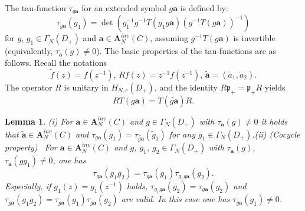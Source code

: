 \documentclass[a4paper]{article}%
\newtheorem{lemma}{Lemma}
\begin{document}
The tau-function $\tau_{g\boldsymbol{a}}$ for an extended symbol
$g\boldsymbol{a}$ is defined by:%
\[
\tau_{g\boldsymbol{a}}\left(  g_{1}\right)  =\det\left(  g_{1}^{-1}%
g^{-1}T\left(  g_{1}g\boldsymbol{a}\right)  \left(  g^{-1}T\left(
g\boldsymbol{a}\right)  \right)  ^{-1}\right)
\]
for $g$, $g_{1}\in\Gamma_{N}\left(  D_{+}\right)  $ and $\boldsymbol{a}%
\in\boldsymbol{A}_{N}^{inv}\left(  C\right)  $, assuming $g^{-1}T\left(
g\boldsymbol{a}\right)  $ is invertible (equivalently, $\tau_{\boldsymbol{a}%
}\left(  g\right)  \neq0$). The basic properties of the tau-functions are as
follows. Recall the notations%
\[
\widetilde{f}\left(  z\right)  =f\left(  z^{-1}\right)  \text{, \ \ }%
Rf(z)=z^{-1}f\left(  z^{-1}\right)  \text{, \ \ }\widetilde{\boldsymbol{a}%
}=\left(  \widetilde{a}_{1},\widetilde{a}_{2}\right)  \text{.}%
\]
The operator $R$ is unitary in $H_{N,c}\left(  D_{+}\right)  $, and the
identity $R\mathfrak{p}_{+}=\mathfrak{p}_{+}R$ yields%
\begin{equation}
RT\left(  g\boldsymbol{a}\right)  =T\left(  \widetilde{g\boldsymbol{a}%
}\right)  R\text{.} \label{2-14}%
\end{equation}


\begin{lemma}
\label{l2-5}(i) For $\boldsymbol{a}\in\boldsymbol{A}_{N}^{inv}\left(
C\right)  $ and $g\in\Gamma_{N}\left(  D_{+}\right)  $ with $\tau
_{\boldsymbol{a}}\left(  g\right)  \neq0$ it holds that $\widetilde
{\boldsymbol{a}}\in\boldsymbol{A}_{N}^{inv}\left(  C\right)  $ and
$\tau_{g\boldsymbol{a}}\left(  g_{1}\right)  =\tau_{\widetilde{g\boldsymbol{a}%
}}\left(  \widetilde{g}_{1}\right)  $ for any $g_{1}\in\Gamma_{N}\left(
D_{+}\right)  $.\newline(ii) (Cocycle property) \ For $\boldsymbol{a}%
\in\boldsymbol{A}_{N}^{inv}\left(  C\right)  $ and $g$, $g_{1}$, $g_{2}%
\in\Gamma_{N}\left(  D_{+}\right)  $ with $\tau_{\boldsymbol{a}}\left(
g\right)  $, $\tau_{\boldsymbol{a}}\left(  gg_{1}\right)  \neq0$, one has%
\[
\tau_{g\boldsymbol{a}}\left(  g_{1}g_{2}\right)  =\tau_{g\boldsymbol{a}%
}\left(  g_{1}\right)  \tau_{g_{1}g\boldsymbol{a}}\left(  g_{2}\right)
\text{.}%
\]
Especially, if $g_{1}(z)=g_{1}(z^{-1})$ holds, $\tau_{g_{1}g\boldsymbol{a}%
}\left(  g_{2}\right)  =\tau_{g\boldsymbol{a}}\left(  g_{2}\right)  $ and
$\tau_{g\boldsymbol{a}}\left(  g_{1}g_{2}\right)  =\tau_{g\boldsymbol{a}%
}\left(  g_{1}\right)  \tau_{g\boldsymbol{a}}\left(  g_{2}\right)  $ are
valid. In this case one has $\tau_{g\boldsymbol{a}}\left(  g_{1}\right)
\neq0$.\newline
\end{lemma}
\end{document}
